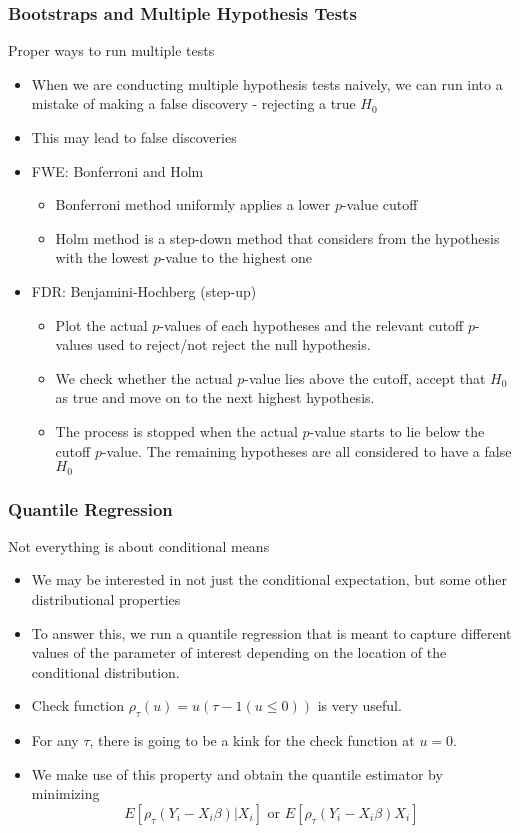 \documentclass{beamer}
\begin{document}
\begin{frame}
\frametitle{Bootstraps and Multiple Hypothesis Tests}
Proper ways to run multiple tests
\begin{itemize}
\item When we are conducting multiple hypothesis tests naively, we can run into a mistake of making a false discovery - rejecting a true $H_0$ 
\item This may lead to false discoveries
\item FWE: Bonferroni and Holm
\begin{itemize}
\item Bonferroni method uniformly applies a lower $p$-value cutoff
\item Holm method is a step-down method that considers from the hypothesis with the lowest $p$-value to the highest one
\end{itemize}
\item FDR: Benjamini-Hochberg (step-up)
\begin{itemize}
\item  Plot the actual $p$-values of each hypotheses and the relevant cutoff $p$-values used to reject/not reject the null hypothesis. \item We check whether the actual $p$-value lies above the cutoff, accept that $H_0$ as true and move on to the next highest hypothesis. 
\item The process is stopped when the actual $p$-value starts to lie below the cutoff $p$-value. The remaining hypotheses are all considered to have a false $H_0$
\end{itemize}
\end{itemize}
\end{frame}

\begin{frame}
\frametitle{Quantile Regression}
Not everything is about conditional means
\begin{itemize}
\item We may be interested in not just the conditional expectation, but some other distributional properties
\item  To answer this, we run a quantile regression that is meant to capture different values of the parameter of interest depending on the location of the conditional distribution.
\item Check function $\rho_\tau(u)=u(\tau-1(u\leq0))$ is very useful. 
\item For any $\tau$, there is going to be a kink for the check function at $u=0$.
\item We make use of this property and obtain the quantile estimator by minimizing 
\[
E[\rho_\tau(Y_i-X_i\beta)|X_i] \text{ or }E[\rho_\tau(Y_i-X_i\beta)X_i]
\]
\end{itemize}
\end{frame}
\end{document}

